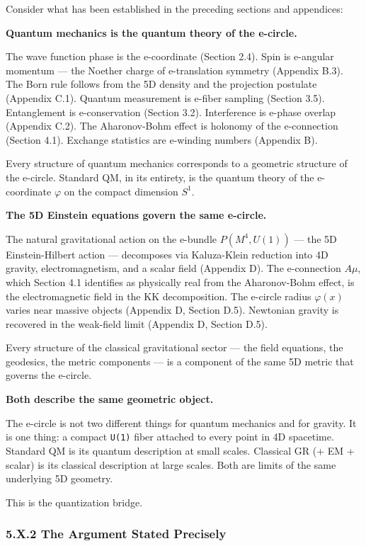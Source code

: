 \documentclass[aps,prd,preprint,superscriptaddress,longbibliography,floatfix]{revtex4-2}
\theoremstyle{remark}
\begin{document}
Consider what has been established in the preceding sections and appendices:

\textbf{Quantum mechanics is the quantum theory of the e-circle.}

The wave function phase is the e-coordinate (Section 2.4). Spin is e-angular momentum --- the Noether charge of e-translation symmetry (Appendix B.3). The Born rule follows from the 5D density and the projection postulate (Appendix C.1). Quantum measurement is e-fiber sampling (Section 3.5). Entanglement is e-conservation (Section 3.2). Interference is e-phase overlap (Appendix C.2). The Aharonov-Bohm effect is holonomy of the e-connection (Section 4.1). Exchange statistics are e-winding numbers (Appendix B).

Every structure of quantum mechanics corresponds to a geometric structure of the e-circle. Standard QM, in its entirety, is the quantum theory of the e-coordinate $\varphi$ on the compact dimension $S^{1}$.

\textbf{The 5D Einstein equations govern the same e-circle.}

The natural gravitational action on the e-bundle $P(M^{4}, U(1))$ --- the 5D Einstein-Hilbert action --- decomposes via Kaluza-Klein reduction into 4D gravity, electromagnetism, and a scalar field (Appendix D). The e-connection $A\mu$, which Section 4.1 identifies as physically real from the Aharonov-Bohm effect, is the electromagnetic field in the KK decomposition. The e-circle radius $\varphi(x)$ varies near massive objects (Appendix D, Section D.5). Newtonian gravity is recovered in the weak-field limit (Appendix D, Section D.5).

Every structure of the classical gravitational sector --- the field equations, the geodesics, the metric components --- is a component of the same 5D metric that governs the e-circle.

\textbf{Both describe the same geometric object.}

The e-circle is not two different things for quantum mechanics and for gravity. It is one thing: a compact \texttt{U(1)} fiber attached to every point in 4D spacetime. Standard QM is its quantum description at small scales. Classical GR (+ EM + scalar) is its classical description at large scales. Both are limits of the same underlying 5D geometry.

This is the quantization bridge.



\subsubsection{5.X.2 The Argument Stated Precisely}
\end{document}
